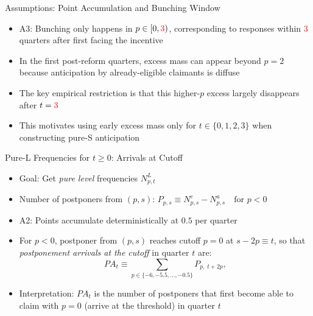 \begin{frame}{Assumptions: Point Accumulation and Bunching Window}
\begin{itemize}
    \item A3: Bunching only happens in $p\in[0,\textcolor{red}{3})$, corresponding to responses within \textcolor{red}{3} quarters after first facing the incentive
    \item In the first post-reform quarters, excess mass can appear beyond $p=2$ because anticipation by already-eligible claimants is diffuse
    \item The key empirical restriction is that this higher-$p$ excess largely disappears after $t=\textcolor{red}{3}$
    \item This motivates using early excess mass only for $t\in\{0,1,2,3\}$ when constructing pure-S anticipation
\end{itemize}
\end{frame}

\begin{frame}[label=pureL]{Pure-L Frequencies for $t\geq 0$: Arrivals at Cutoff}
\begin{itemize}
    \item Goal: Get \emph{pure level} frequencies $N^{L}_{p,t}$
    \item Number of postponers from $(p,s)$: $P_{p,s}\equiv N^{c}_{p,s}-N^{a}_{p,s}\quad\text{for }p<0$
    \item A2: Points accumulate deterministically at $0.5$ per quarter
    \item For $p<0$, postponer from $(p,s)$ reaches cutoff $p=0$ at $s-2p\equiv t$, so that \emph{postponement arrivals at the cutoff} in quarter $t$ are:
    \[
        PA_{t} \equiv \sum_{p\in\{-6,-5.5,\dots,-0.5\}} P_{p,\;t+2p},
    \]
    \item Interpretation: $PA_{t}$ is the number of postponers that first become able to claim with $p=0$ (arrive at the threshold) in quarter $t$
\end{itemize}
\end{frame}

